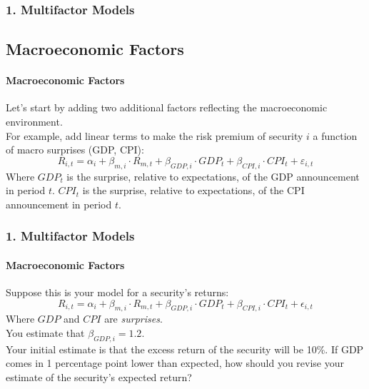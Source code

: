 \documentclass{beamer}
\begin{document}
\begin{frame}[t]
    \frametitle{1. Multifactor Models}
    \subsection{Macroeconomic Factors}
    \framesubtitle{Macroeconomic Factors}
 
    Let's start by adding two additional factors reflecting the macroeconomic 
    environment.\\
    \vspace{1em}
    For example, add linear terms to make the risk premium of security $i$ a 
    function of macro surprises (GDP, CPI):
    $$R_{i,t} = \alpha_i + \beta_{m,i} \cdot R_{m,t} + \beta_{GDP,i} \cdot GDP_t + \beta_{CPI,i} \cdot CPI_t + \varepsilon_{i,t}$$
    Where $GDP_t$ is the surprise, relative to expectations, of the GDP announcement in period $t$.  $CPI_t$ is the surprise, relative to expectations, of the CPI announcement in period $t$.


\end{frame}

\begin{frame}[t]
    \frametitle{1. Multifactor Models}
    \framesubtitle{Macroeconomic Factors}

    Suppose this is your model for a security's returns: 
        $$R_{i,t} = \alpha_i + \beta_{m,i} \cdot R_{m,t} + \beta_{GDP,i} \cdot GDP_t + \beta_{CPI,i} \cdot CPI_t + \epsilon_{i,t}$$
    Where $GDP$ and $CPI$ are \textit{surprises}.\\
    \vspace{1em}
    You estimate that $\beta_{GDP,i} = 1.2$.\\
    \vspace{1em}
    Your initial estimate is that the excess return of the security will 
    be 10\%.   If GDP comes in 1 percentage point lower than expected, 
    how should you revise your estimate of the security's expected return?

\end{frame}
\end{document}
